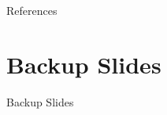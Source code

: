 \documentclass[aspectratio=169]{beamer}                    %
\renewcommand{\pageword}{Slide}
\begin{document}
\begingroup
\renewcommand{\insertframenumber}{}
\renewcommand{\pageword}{}
\begin{frame}{References}
	\printbibliography
\end{frame}

\appendix %
\section*{Backup Slides}
\begin{frame}[noframenumbering]
	\centering
	\vfill
	{\fontsize{40}{50}\selectfont Backup Slides}
	\vfill
\end{frame}




\endgroup
\end{document}
